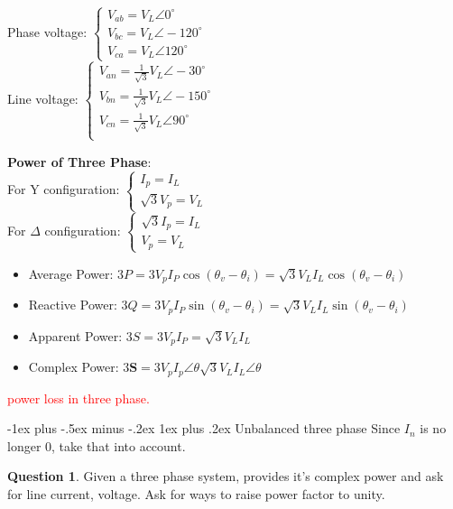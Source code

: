 \documentclass[10pt,landscape]{article}
\makeatletter
\renewcommand{\subsubsection}{\@startsection{subsubsection}{3}{0mm}%
                                {-1ex plus -.5ex minus -.2ex}%
                                {1ex plus .2ex}%
                                {\normalfont\small\bfseries}}
\newcommand\todo[1]{\textcolor{red}{#1}}
\theoremstyle{definition}
\newtheorem*{question}{Question}
\theoremstyle{remark}
\makeatother
\begin{document}
\begin{multicols}{3}
\begin{itemize}
   Phase voltage: $
    \begin{cases}
    V_{ab} = V_L \angle 0^{\circ} \\
    V_{bc} = V_L \angle -120^{\circ} \\
    V_{ca} = V_L \angle 120^{\circ}   
    \end{cases}
    $\\
    
    Line voltage: $
    \begin{cases}
    V_{an} =\frac{1}{\sqrt{3}} V_L \angle -30^{\circ} \\
    V_{bn} =\frac{1}{\sqrt{3}} V_L \angle -150^{\circ} \\
    V_{cn} =\frac{1}{\sqrt{3}} V_L \angle 90^{\circ} \\
    \end{cases}
    $
\end{itemize}

\textbf{Power of Three Phase}: \\
For Y configuration: 
$\begin{cases}
I_p = I_L \\
\sqrt{3} V_p = V_L
\end{cases}$
\\
For $\Delta$ configuration: 
$\begin{cases}
\sqrt{3} I_p = I_L \\
V_p = V_L
\end{cases}$
\begin{itemize}[noitemsep,nolistsep]
    \item Average Power: $3P = 3V_pI_P\cos(\theta_v-\theta_i) =  \sqrt{3}V_LI_L\cos(\theta_v-\theta_i)$
    \item Reactive Power: $3Q =3V_pI_P\sin(\theta_v-\theta_i) = \sqrt{3}V_LI_L\sin(\theta_v-\theta_i)$
    \item Apparent Power: $3S =3V_pI_P = \sqrt{3}V_LI_L$
    \item Complex Power: $3\pmb{S} =3V_pI_p \angle\theta \sqrt{3}V_LI_L\angle\theta$
\end{itemize}
\todo{power loss in three phase.}

\subsubsection{Unbalanced three phase}
Since $I_n$ is no longer 0, take that into account. 

\begin{question}
Given a three phase system, provides it's complex power and ask for line current, voltage. Ask for ways to raise power factor to unity. 
\end{question}


\end{multicols}
\end{document}
